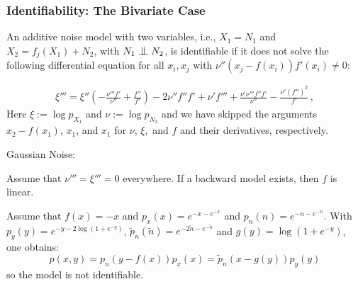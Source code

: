 \documentclass{beamer}
\newcommand{\bigCI}{\mathrel{\text{\scalebox{1.07}{$\perp\mkern-10mu\perp$}}}}
\begin{document}
\begin{frame}
\frametitle{Identifiability: The Bivariate Case}
\begin{theorem}
\begin{small}
An additive noise model with two variables, i.e., $X_1 = N_1$ and $X_2 = f_j(X_1) + N_2$, with $N_1 \bigCI N_2$, is identifiable if it does not solve the following differential equation for all $x_i,x_j$ with $\nu''(x_j-f(x_i))f'(x_i)\neq 0$:

\begin{equation*}
\begin{split}
\xi'''=   \xi''  \left(-\frac{\nu'''f'}{\nu''}
+\frac{f''}{f'}\right) 
-2 \nu''f''f' %
+\nu'f'''+\frac{\nu'\nu'''f''f'}{\nu''}-\frac{\nu'(f'')^2}{f'}\,,
\end{split}
\end{equation*}
Here $\xi:=\log p_{X_1}$ and $\nu:=\log p_{N_2}$ and we have skipped the arguments $x_2-f(x_1)$, $x_1$, and $x_1$  for $\nu$, $\xi,$ and $f$ and their derivatives, respectively.
\end{small}
\end{theorem}\end{frame}

\begin{frame}
\begin{corollary}{Gaussian Noise:}
\begin{small}
Assume that $\nu'''= \xi''' = 0$ everywhere. If a backward model exists, then $f$ is linear.
\end{small}
\end{corollary}
\begin{corollary}
\begin{small}
Assume that $f(x) = −x$ and $p_x(x) = e^{-x-e^{-x}}$ and $p_n(n) = e^{-n-e^{-n}}$.
With $p_y(y) = e^{-y-2 \log(1 + e^{−y})}$, $\tilde{p}_n(\tilde{n}) = e^{-2\tilde{n}-e^{-\tilde{n}}}$ and $g(y) = \log(1+e^{-y})$, one obtains:
$$p(x,y) =p_n(y-f(x))p_x(x) =\tilde{p}_n(x-g(y))p_y(y)$$
so the model is not identifiable.
\end{small}
\end{corollary}
\end{frame}
\end{document}
